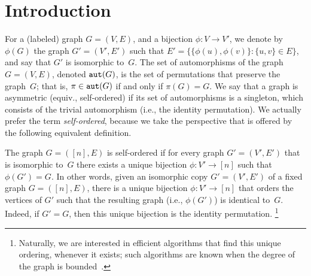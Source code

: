 




















































\section{Introduction}
For a (labeled) graph $G=(V,E)$, and a bijection $\phi:V\to V'$,
we denote by $\phi(G)$ the graph $G'=(V',E')$
such that $E'=\{\{\phi(u),\phi(v)\}:\{u,v\}\!\in\!E\}$,
and say that $G'$ is {\sf isomorphic} to~$G$.
The set of {\sf automorphisms} of the graph $G=(V,E)$,
denoted ${\tt aut}(G)$,
is the set of permutations that preserve the graph~$G$;
that is, $\pi\in{\tt aut}(G)$ if and only if $\pi(G)=G$.
We say that a graph is {\sf asymmetric} (equiv., {\sf self-ordered})
if its set of automorphisms is a singleton,
which consists of the trivial automorphism
(i.e., the identity permutation).
We actually prefer the term {\em self-ordered}, because we take
the perspective that is offered by the following equivalent definition.

%
\label{asymmetric:def}
%
The graph $G=([n],E)$ is {\sf self-ordered}
if for every graph $G'=(V',E')$ that is isomorphic to~$G$
there exists a unique bijection $\phi:V'\to[n]$ such that $\phi(G')=G$.
\ED
In other words,
given an isomorphic copy $G'=(V',E')$ of a fixed graph $G=([n],E)$,
there is a unique bijection $\phi:V'\to[n]$ that orders the vertices of $G'$
such that the resulting graph (i.e., $\phi(G')$) is identical to~$G$.
Indeed, if $G'=G$, then this unique bijection is the identity permutation.
\footnote{Naturally, we are interested in efficient algorithms
that find this unique ordering, whenever it exists;
such algorithms are known
when the degree of the graph is bounded~\cite{L}.}

